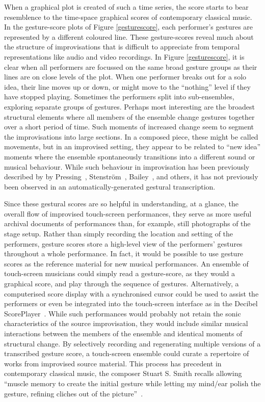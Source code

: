 \documentclass[graybox]{svmult}
\begin{document}
When a graphical plot is created of such a time series, the score
starts to bear resemblence to the time-space graphical scores of
contemporary classical music. In the gesture-score plots of Figure
\ref{gesturescore}, each performer's gestures are represented by a
different coloured line. These gesture-scores reveal much about the
structure of improvisations that is difficult to appreciate from
temporal representations like audio and video recordings. In Figure
\ref{gesturescore}, it is clear when all performers are focussed on
the same broad gesture groups as their lines are on close levels of
the plot. When one performer breaks out for a solo idea, their line
moves up or down, or might move to the ``nothing'' level if they 
have stopped playing. Sometimes the performers split into
sub-ensembles, exploring separate groups of gestures. Perhaps most
interesting are the broadest structural elements where all members of
the ensemble change gestures together over a short period of time.
Such moments of increased change seem to segment the improvisations
into large sections. In a composed piece, these might be called
movements, but in an improvised setting, they appear to be related to
``new idea'' moments where the ensemble spontaneously transitions into
a different sound or musical behaviour. While such behaviour in
improvisation has been previously described by by
Pressing~\cite{Pressing:1988uo}, Stenstr\"om~\cite{Stenstrom:2009xy},
Bailey~\cite{Bailey:1993zl}, and others, it has not previously been
observed in an automatically-generated gestural transcription.

Since these gestural scores are so helpful in understanding, at a
glance, the overall flow of improvised touch-screen performances, they
serve as more useful archival documents of performances than, for
example, still photographs of the stage setup. Rather than simply
recording the location and setting of the performers, gesture scores
store a high-level view of the performers' gestures throughout a whole
performance. In fact, it would be possible to use gesture scores as
the reference material for new musical performances. An ensemble of
touch-screen musicians could simply read a gesture-score, as they
would a graphical score, and play through the sequence of gestures.
Alternatively, a computerised score display with a synchronised cursor
could be used to assist the performers or even be integrated into the
touch-screen interface as in the Decibel
ScorePlayer~\cite{Hope:2015lr}. While such performances would probably
not retain the sonic characteristics of the source improvisation, they
would include similar musical interactions between the members of the
ensemble and identical moments of structural change. By selectively
recording and regenerating multiple versions of a transcribed gesture
score, a touch-screen ensemble could curate a repertoire of works from
improvised source material. This process has precedent in contemporary
classical music, the composer Stuart S. Smith recalls allowing
``muscle memory to create the initial gesture while letting my
mind/ear polish the gesture, refining cliches out of the
picture''~\cite{Smith:1998ff}.
\end{document}
